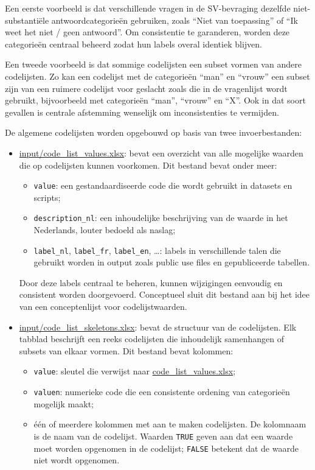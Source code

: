 \documentclass{VSAnote}
\begin{document}
Een eerste voorbeeld is dat verschillende vragen in de SV-bevraging dezelfde niet-substantiële antwoordcategorieën gebruiken, zoals ``Niet van toepassing'' of ``Ik weet het niet / geen antwoord''. Om consistentie te garanderen, worden deze categorieën centraal beheerd zodat hun labels overal identiek blijven.

Een tweede voorbeeld is dat sommige codelijsten een subset vormen van andere codelijsten. Zo kan een codelijst met de categorieën ``man'' en ``vrouw'' een subset zijn van een ruimere codelijst voor geslacht zoals die in de vragenlijst wordt gebruikt, bijvoorbeeld met categorieën ``man'', ``vrouw'' en ``X''. Ook in dat soort gevallen is centrale afstemming wenselijk om inconsistenties te vermijden.

De algemene codelijsten worden opgebouwd op basis van twee invoerbestanden:

\begin{itemize}

\item \url{input/code_list_values.xlsx}: bevat een overzicht van alle mogelijke waarden die op codelijsten kunnen voorkomen. Dit bestand bevat onder meer:
\begin{itemize}
\item \verb+value+: een gestandaardiseerde code die wordt gebruikt in datasets en scripts;
\item \verb+description_nl+: een inhoudelijke beschrijving van de waarde in het Nederlands, louter bedoeld als naslag;
\item \verb+label_nl+, \verb+label_fr+, \verb+label_en+, \ldots: labels in verschillende talen die gebruikt worden in output zoals public use files en gepubliceerde tabellen.
\end{itemize}

Door deze labels centraal te beheren, kunnen wijzigingen eenvoudig en consistent worden doorgevoerd. Conceptueel sluit dit bestand aan bij het idee van een conceptenlijst voor codelijstwaarden.

\item \url{input/code_list_skeletons.xlsx}: bevat de structuur van de codelijsten. Elk tabblad beschrijft een reeks codelijsten die inhoudelijk samenhangen of subsets van elkaar vormen. Dit bestand bevat kolommen:
\begin{itemize}
\item \verb+value+: sleutel die verwijst naar \url{code_list_values.xlsx};
\item \verb+valuen+: numerieke code die een consistente ordening van categorieën mogelijk maakt;
\item één of meerdere kolommen met aan te maken codelijsten. De kolomnaam is de naam van de codelijst. Waarden \verb+TRUE+ geven aan dat een waarde moet worden opgenomen in de codelijst; \verb+FALSE+ betekent dat de waarde niet wordt opgenomen.
\end{itemize}

\end{itemize}
\end{document}
